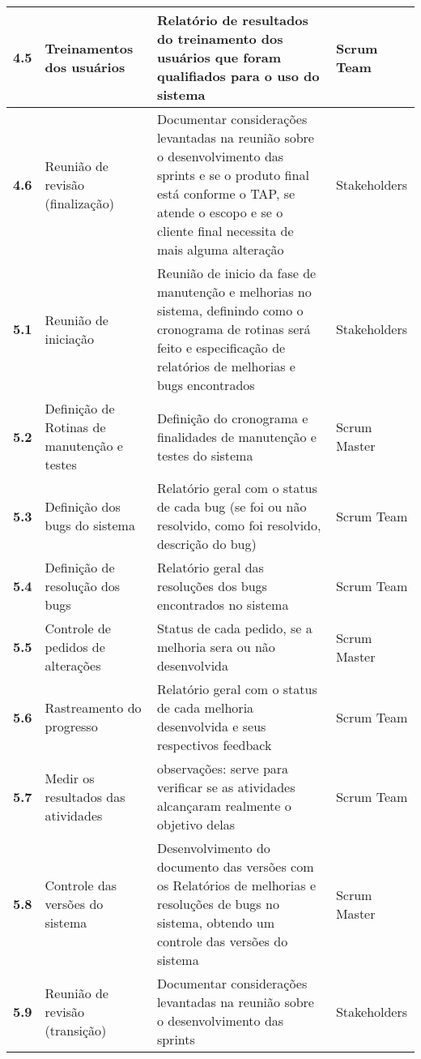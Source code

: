 \begin{longtable}[c]{|p{1.89em}|p{13.555em}|p{17.61em}|p{6.22em}|}
    \midrule
    \textbf{4.5} & Treinamentos dos usuários & Relatório de resultados do treinamento dos usuários que foram qualifiados para o uso do sistema & Scrum Team \\
    \midrule
    \textbf{4.6} & Reunião de revisão (finalização) & Documentar considerações levantadas na reunião sobre o desenvolvimento das sprints e se o produto final está conforme o TAP, se atende o escopo e se o cliente final necessita de mais alguma alteração & Stakeholders \\
    \midrule
    \textbf{5.1} & Reunião de iniciação & Reunião de inicio da fase de manutenção e melhorias no sistema, definindo como o cronograma de rotinas será feito e especificação de relatórios de melhorias e bugs encontrados & Stakeholders \\
    \midrule
    \textbf{5.2} & Definição de Rotinas de manutenção e testes & Definição do cronograma e finalidades de manutenção e testes do sistema & Scrum Master \\
    \midrule
    \textbf{5.3} & Definição dos bugs do sistema & Relatório geral com o status de cada bug (se foi ou não resolvido, como foi resolvido, descrição do bug) & Scrum Team \\
    \midrule
    \textbf{5.4} & Definição de resolução dos bugs & Relatório geral das resoluções dos bugs encontrados no sistema\newline{} & Scrum Team \\
    \midrule
    \textbf{5.5} & Controle de pedidos de alterações & Status de cada pedido, se a melhoria sera ou não desenvolvida & Scrum Master \\
    \midrule
    \textbf{5.6} & Rastreamento do progresso & Relatório geral com o status de cada melhoria desenvolvida e seus respectivos feedback & Scrum Team \\
    \midrule
    \textbf{5.7} & Medir os resultados das atividades & observações: serve para verificar se as atividades alcançaram realmente o objetivo delas & Scrum Team \\
    \midrule
    \textbf{5.8} & Controle das versões do sistema & Desenvolvimento do documento das versões com os Relatórios de melhorias e resoluções de bugs no sistema, obtendo um controle das versões do sistema & Scrum Master \\
    \midrule
    \textbf{5.9} & Reunião de revisão (transição) & Documentar considerações levantadas na reunião sobre o desenvolvimento das sprints & Stakeholders \\
    \bottomrule
    \end{longtable}
